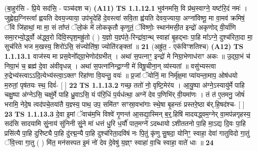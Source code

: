 \documentclass[17pt]{extarticle}
\begin{document}
                  \newline
                      (बा॒हुर॑सि - प्रि॒ये सद॑सि॒ - पञ्च॑दश च)  \textbf{(A11)} \newline \newline
                                        \textbf{ TS 1.1.12.1} \newline
                  भुव॑नमसि॒ वि प्र॑थ॒स्वाग्ने॒ यष्ट॑रि॒दं नमः॑ । जुह्वेह्य॒ग्निस्त्वा᳚ ह्वयति देवय॒ज्याया॒ उप॑भृ॒देहि॑ दे॒वस्त्वा॑ सवि॒ता ह्व॑यति देवय॒ज्याया॒ अग्ना॑विष्णू॒ मा वा॒मव॑ क्रमिषं॒ ॅवि जि॑हाथां॒ मा मा॒ सं ता᳚प्तं ॅलो॒कं मे॑ लोककृतौ कृणुतं॒ ॅविष्णोः॒ स्थान॑मसी॒त इन्द्रो॑ अकृणोद् वी॒र्या॑णि समा॒रभ्यो॒र्द्ध्वो अ॑द्ध्व॒रो दि॑वि॒स्पृश॒मह्रु॑तो ( ) य॒ज्ञो य॒ज्ञ्प॑ते॒-रिन्द्रा॑वा॒न्थ् स्वाहा॑ बृ॒हद्भाः पा॒हि मा᳚ऽग्ने॒ दुश्च॑रिता॒दा मा॒ सुच॑रिते भज म॒खस्य॒ शिरो॑ऽसि॒ संज्योति॑षा॒ ज्योति॑रङ्क्तां ॥ \textbf{  21 } \newline
                  \newline
                      (अह्रु॑त॒ - एक॑विꣳशतिश्च)  \textbf{(A12)} \newline \newline
                                        \textbf{ TS 1.1.13.1} \newline
                  वाज॑स्य मा प्रस॒वेनो᳚द्ग्रा॒भेणोद॑ग्रभीत् । अथा॑ स॒पत्नाꣳ॒॒ इन्द्रो॑ मे निग्रा॒भेणाध॑राꣳ अकः ॥ उ॒द्ग्रा॒भं च॑ निग्रा॒भं च॒ ब्रह्म॑ दे॒वा अ॑वीवृधन्न् । अथा॑ स॒पत्ना॑निन्द्रा॒ग्नी मे॑ विषू॒चीना॒न् व्य॑स्यतां ॥ वसु॑भ्यस्त्वा रु॒द्रेभ्य॑स्त्वाऽऽदि॒त्येभ्य॑स्त्वा॒ऽक्तꣳ रिहा॑णा वि॒यन्तु॒ वयः॑ ॥ प्र॒जां ॅयोनिं॒ मा निर्मृ॑क्ष॒मा प्या॑यन्ता॒माप॒ ओष॑धयो म॒रुतां॒ पृष॑तयः स्थ॒ दिवं॑- [ ] \textbf{  22} \newline
                  \newline
                                \textbf{ TS 1.1.13.2} \newline
                  गच्छ॒ ततो॑ नो॒ वृष्टि॒मेर॑य । आ॒यु॒ष्पा अ॑ग्ने॒ऽस्यायु॑र्मे पाहि चक्षु॒ष्पा अ॑ग्नेऽसि॒ चक्षु॑र्मे पाहि ध्रु॒वाऽसि॒ यं प॑रि॒धिं प॒र्यध॑त्था॒ अग्ने॑ देव प॒णिभि॑र् वी॒यमा॑णः । तं त॑ ए॒तमनु॒ जोषं॑ भरामि॒ नेदे॒ष त्वद॑पचे॒तया॑तै य॒ज्ञ्स्य॒ पाथ॒ उप॒ समि॑तꣳ सꣳस्रा॒वभा॑गाः स्थे॒षा बृ॒हन्तः॑ प्रस्तरे॒ष्ठा ब॑र्.हि॒षद॑श्च- [ ] \textbf{  23} \newline
                  \newline
                                \textbf{ TS 1.1.13.3} \newline
                  दे॒वा इ॒मां ॅवाच॑म॒भि विश्वे॑ गृ॒णन्त॑ आ॒सद्या॒स्मिन् ब॒र्॒.हिषि॑ मादयद्ध्वम॒ग्नेर् वा॒मप॑न्नगृहस्य॒ सद॑सि सादयामि सुं॒नाय॑ सुंनिनी सुं॒ने मा॑ धत्तं धु॒रि ध॒र्यौ॑ पात॒मग्ने॑ ऽदब्धायो ऽशीततनो पा॒हि मा॒ऽद्य दि॒वः पा॒हि प्रसि॑त्यै पा॒हि दुरि॑ष्ट्यै पा॒हि दु॑रद्म॒न्यै पा॒हि दुश्च॑रिता॒दवि॑षं नः पि॒तुं कृ॑णु सु॒षदा॒ योनिꣳ॒॒ स्वाहा॒ देवा॑ गातुविदो गा॒तुं ॅवि॒त्त्वा गा॒तु ( ) मि॑त॒ मन॑सस्पत इ॒मं नो॑ देव दे॒वेषु॑ य॒ज्ञ्ꣳ स्वाहा॑ वा॒चि स्वाहा॒ वाते॑ धाः ॥ \textbf{  24} \newline
\end{document}
